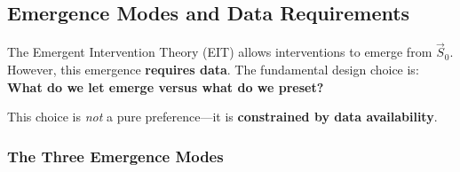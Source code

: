 
\subsection{Emergence Modes and Data Requirements}
\label{sec:hhh-emergence-modes}

\begin{tcolorbox}[colback=red!5!white, colframe=red!75!black,
    title=\textbf{Critical: The Emergence-Data Interaction}]

The Emergent Intervention Theory (EIT) allows interventions to emerge from $\vec{S}_0$. However, this emergence \textbf{requires data}. The fundamental design choice is: \textbf{What do we let emerge versus what do we preset?}

This choice is \textit{not} a pure preference---it is \textbf{constrained by data availability}.
\end{tcolorbox}

\subsubsection{The Three Emergence Modes}

